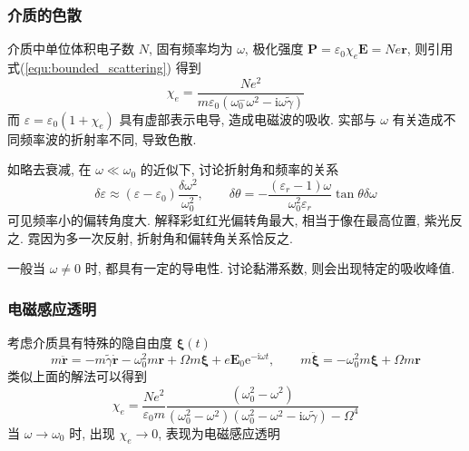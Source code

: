 \documentclass[12pt,a4paper]{article}%
\numberwithin{equation}{section}%
\renewcommand*{\vec}[1]{\bm{#1}}%
\newcommand\mi{\mathrm{i}}
\newcommand\e{\mathrm{e}}%
\begin{document}
\subsubsection{介质的色散} %
\label{ssub:medium_scattering}
介质中单位体积电子数 $N$, 固有频率均为 $\omega$, 极化强度 $\vec P = \varepsilon_0\chi_e \vec E = Ne \vec r$, 则引用式(\ref{equ:bounded_scattering}) 得到
\begin{equation}
    \chi_e = \frac{Ne^2}{m\varepsilon_0(\omega_0^-\omega^2 - \mi\omega\tilde{\gamma})}
\end{equation}
而 $\varepsilon = \varepsilon_0(1+\chi_e)$ 具有虚部表示电导, 造成电磁波的吸收. 实部与 $\omega$ 有关造成不同频率波的折射率不同, 导致色散.

如略去衰减, 在 $\omega\ll\omega_0$ 的近似下, 讨论折射角和频率的关系
\begin{equation}
    \delta\varepsilon \approx (\varepsilon - \varepsilon_0)\frac{\delta\omega^2}{\omega_0^2}, \qquad \delta\theta = -\frac{(\varepsilon_r - 1)\omega}{\omega_0^2\varepsilon_r}\tan\theta\delta\omega
\end{equation}
可见频率小的偏转角度大. 解释彩虹红光偏转角最大, 相当于像在最高位置, 紫光反之. 霓因为多一次反射, 折射角和偏转角关系恰反之.

一般当 $\omega\neq 0 $ 时, 都具有一定的导电性. 讨论黏滞系数, 则会出现特定的吸收峰值.
\subsubsection{电磁感应透明} %
\label{ssub:EM_transparency}
考虑介质具有特殊的隐自由度 $\vec\xi(t)$
\begin{equation}
    m\ddot{\vec r} = -m\tilde\gamma\dot{\vec r} - \omega_0^2 m\vec r + \Omega m\vec\xi + e\vec E_0\e^{-\mi\omega t},\qquad m\ddot{\vec \xi} = -\omega_0^2 m\vec \xi + \Omega m\vec r
\end{equation}
类似上面的解法可以得到
\begin{equation}
    \chi_e = \frac{Ne^2}{\varepsilon_0 m}\frac{(\omega_0^2 - \omega^2)}{(\omega_0^2 - \omega^2)(\omega_0^2 - \omega^2 - \mi\omega\tilde\gamma)-\Omega^4}
\end{equation}
当 $\omega\to\omega_0$ 时, 出现 $\chi_e\to 0$, 表现为电磁感应透明
\end{document}
